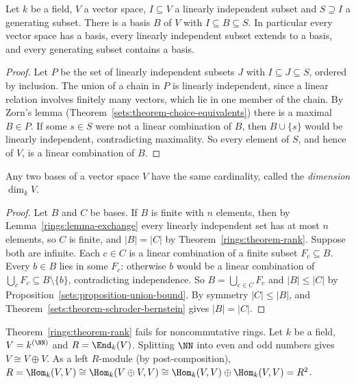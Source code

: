 \begin{theorem}\label{rings:theorem-bases-exist}
Let $k$ be a field, $V$ a vector space, $I \subseteq V$ a linearly independent subset and
$S \supseteq I$ a generating subset. There is a basis $B$ of $V$ with $I \subseteq B \subseteq S$. In
particular every vector space has a basis, every linearly independent subset extends
to a basis, and every generating subset contains a basis.
\end{theorem}

\begin{proof}
Let $P$ be the set of linearly independent subsets $J$ with $I \subseteq J \subseteq S$, ordered
by inclusion. The union of a chain in $P$ is linearly independent, since a linear
relation involves finitely many vectors, which lie in one member of the chain. By
Zorn's lemma (Theorem~\ref{sets:theorem-choice-equivalents}) there is a maximal
$B \in P$. If some $s \in S$ were not a linear combination of $B$, then $B \cup \{s\}$ would be
linearly independent, contradicting maximality. So every element of $S$, and hence of
$V$, is a linear combination of $B$.
\end{proof}

\begin{theorem}\label{rings:theorem-dimension}
Any two bases of a vector space $V$ have the same cardinality, called the
\emph{dimension} $\dim_k V$.
\end{theorem}

\begin{proof}
Let $B$ and $C$ be bases. If $B$ is finite with $n$ elements, then by
Lemma~\ref{rings:lemma-exchange} every linearly independent set has at most $n$
elements, so $C$ is finite, and $|B| = |C|$ by Theorem~\ref{rings:theorem-rank}.
Suppose both are infinite. Each $c \in C$ is a linear combination of a finite subset
$F_c \subseteq B$. Every $b \in B$ lies in some $F_c$: otherwise $b$ would be a linear
combination of $\bigcup_c F_c \subseteq B \setminus \{b\}$, contradicting independence. So
$B = \bigcup_{c \in C} F_c$ and $|B| \leq |C|$ by Proposition~\ref{sets:proposition-union-bound}.
By symmetry $|C| \leq |B|$, and Theorem~\ref{sets:theorem-schroder-bernstein} gives
$|B| = |C|$.
\end{proof}

\begin{counterexample}\label{rings:counterexample-rank-noncommutative}
Theorem~\ref{rings:theorem-rank} fails for noncommutative rings. Let $k$ be a field,
$V = k^{(\NN)}$ and $R = \End_k(V)$. Splitting $\NN$ into even and odd numbers gives
$V \cong V \oplus V$. As a left $R$-module (by post-composition),
$R = \Hom_k(V, V) \cong \Hom_k(V \oplus V, V) \cong \Hom_k(V, V) \oplus \Hom_k(V, V) = R^2$.
\end{counterexample}

